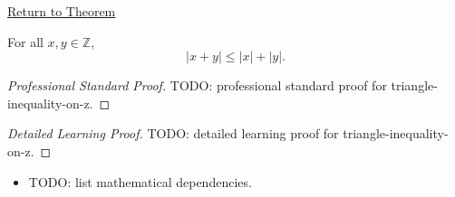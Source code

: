 \newpage
{}
\label{prf:triangle-inequality-on-z}

\begin{remark*}[Return]
\hyperref[thm:triangle-inequality-on-z]{Return to Theorem}
\end{remark*}

\begin{theorem*}
For all $x,y\in\mathbb{Z}$,
\[
|x+y|\le |x|+|y|.
\]
\end{theorem*}

\begin{proof}[Professional Standard Proof]
\LRAProofBodyStart
TODO: professional standard proof for triangle-inequality-on-z.
\end{proof}

\begin{proof}[Detailed Learning Proof]
\LRAProofBodyStart
TODO: detailed learning proof for triangle-inequality-on-z.
\end{proof}

\begin{remark*}
\end{remark*}

\begin{dependencies}
\begin{itemize}
  \item TODO: list mathematical dependencies.
\end{itemize}
\end{dependencies}

\clearpage
